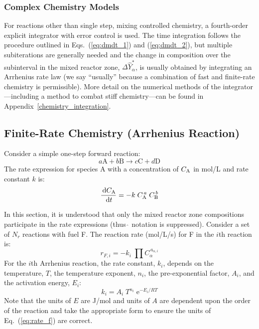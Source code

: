 \subsubsection{Complex Chemistry Models}

For reactions other than single step, mixing controlled chemistry, a fourth-order explicit integrator with error control is used. The time integration follows the procedure outlined in Eqs.~(\ref{eq:dmdt_1}) and (\ref{eq:dmdt_2}), but multiple subiterations are generally needed and the change in composition over the subinterval in the mixed reactor zone, $\Delta \hat{Y}_\alpha^*$, is usually obtained by integrating an Arrhenius rate law (we say ``usually'' because a combination of fast and finite-rate chemistry is permissible). More detail on the numerical methods of the integrator---including a method to combat stiff chemistry---can be found in Appendix~\ref{chemistry_integration}.

\subsection{Finite-Rate Chemistry (Arrhenius Reaction)}
\label{Reaction_Rate_Model}
Consider a simple one-step forward reaction:
\begin{equation}\label{eq:generic_1step}
a\mathrm{A} + b\mathrm{B} \rightarrow c\mathrm{C} + d\mathrm{D}
\end{equation}
The rate expression for species A with a concentration of $C_{\mbox{\scriptsize A}}$ in mol/L and rate constant $k$ is:
\begin{equation}\label{eq:generic_rate}
\frac{\,\mathrm{d} C_{\mbox{\scriptsize A}}}{\,\mathrm{d} t}= -k\; C_{\mbox{\scriptsize A}}^{\,a}\; C_{\mbox{\scriptsize B}}^{\,b}
\end{equation}

In this section, it is understood that only the mixed reactor zone compositions participate in the rate expressions (thus $\hat{\,}$ notation is suppressed). Consider a set of $N_r$ reactions with fuel F. The reaction rate (mol/L/s) for F in the $i$th reaction is:
\begin{equation}\label{eq:rate_f}
r_{\si{F},i}= -k_{i}\; \prod C_{\alpha}^{\,a_{\alpha,i}}
\end{equation}
For the $i$th Arrhenius reaction, the rate constant, $k_i$, depends on the temperature, $T$, the temperature exponent, $n_i$, the pre-exponential factor, $A_i$, and the activation energy, $E_i$:
\begin{equation}\label{eq:rate_cons}
k_i = A_i\;T^{n_i}\;\mathrm{e}^{-E_i/RT}
\end{equation}
Note that the units of $E$ are J/mol and units of $A$ are dependent upon the order of the reaction and take the appropriate form to ensure the units of Eq.~(\ref{eq:rate_f}) are correct.

